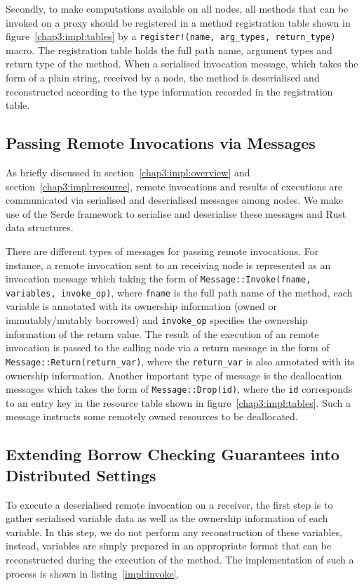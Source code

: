 Secondly, to make computations available on all nodes, all methods that can be invoked on a proxy should be registered in a method registration table shown in figure~\ref{chap3:impl:tables} by a \texttt{register!(name, arg\_types, return\_type)} macro. The registration table holds the full path name, argument types and return type of the method. When a serialised invocation message, which takes the form of a plain string, received by a node, the method is deserialised and reconstructed according to the type information recorded in the registration table.

\subsection{Passing Remote Invocations via Messages}
\label{impl:message}
As briefly discussed in section~\ref{chap3:impl:overview} and section~\ref{chap3:impl:resource}, remote invocations and results of executions are communicated via serialised and deserialised messages among nodes. We make use of the Serde \citep{serde} framework to serialise and deserialise these messages and Rust data structures.

There are different types of messages for passing remote invocations. For instance, a remote invocation sent to an receiving node is represented as an invocation message which taking the form of \texttt{Message::Invoke(fname, variables, invoke\_op)}, where \texttt{fname} is the full path name of the method, each variable is annotated with its ownership information (owned or immutably/mutably borrowed) and \texttt{invoke\_op} specifies the ownership information of the return value. The result of the execution of an remote invocation is passed to the calling node via a return message in the form of \texttt{Message::Return(return\_var)}, where the \texttt{return\_var} is also annotated with its ownership information. Another important type of message is the deallocation messages which takes the form of \texttt{Message::Drop(id)}, where the \texttt{id} corresponds to an entry key in the resource table shown in figure~\ref{chap3:impl:tables}. Such a message instructs some remotely owned resources to be deallocated.

\subsection{Extending Borrow Checking Guarantees into Distributed Settings}
\label{impl:borrow}
To execute a deserialised remote invocation on a receiver, the first step is to gather serialised variable data as well as the ownership information of each variable. In this step, we do not perform any reconstruction of these variables, instead, variables are simply prepared in an appropriate format that can be reconstructed during the execution of the method. The implementation of such a process is shown in listing~\ref{impl:invoke}.

